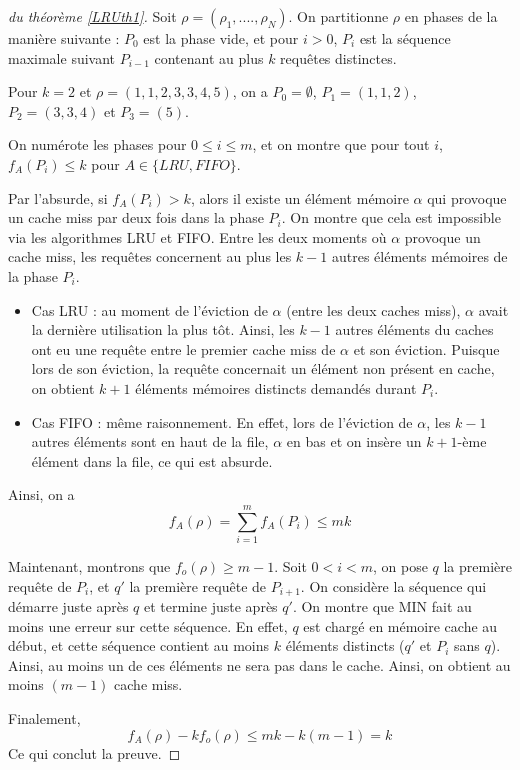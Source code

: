\begin{proof}[du théorème \ref{LRUth1}]
Soit $\rho=(\rho_1,....,\rho_N)$. On partitionne $\rho$ en phases de la manière suivante : $P_0$ est la phase vide, et pour $i>0$, $P_i$ est la séquence maximale suivant $P_{i-1}$ contenant au plus $k$ requêtes distinctes.

\begin{example} Pour $k=2$ et $\rho=(1,1,2,3,3,4,5)$, on a $P_0=\emptyset$, $P_1=(1,1,2)$, $P_2=(3,3,4)$ et $P_3=(5)$.
\end{example}

On numérote les phases pour $0\leq i \leq m$, et on montre que pour tout $i$, $f_A(P_i) \leq k$ pour $A\in \{LRU,FIFO\}$.

Par l'absurde, si $f_{A}(P_i)>k$, alors il existe un élément mémoire $\alpha$  qui provoque un cache miss par deux fois dans la phase $P_i$. On montre que cela est impossible via les algorithmes LRU et FIFO. Entre les deux moments où $\alpha$ provoque un cache miss, les requêtes concernent au plus les $k-1$ autres éléments mémoires de la phase $P_i$. 
\begin{itemize}
\item Cas LRU : au moment de l'éviction de $\alpha$ (entre les deux caches miss), $\alpha$ avait la dernière utilisation la plus tôt. Ainsi, les $k-1$ autres éléments du caches ont eu une requête entre le premier cache miss de $\alpha$ et son éviction. Puisque lors de son éviction, la requête concernait un élément non présent en cache, on obtient $k+1$ éléments mémoires distincts demandés durant $P_i$.
\item Cas FIFO : même raisonnement. En effet, lors de l'éviction de $\alpha$, les $k-1$ autres éléments sont en haut de la file, $\alpha$ en bas et on insère un $k+1$-ème élément dans la file, ce qui est absurde.
\end{itemize}

Ainsi, on a 
$$
f_A(\rho) = \sum_{i=1}^m f_A(P_i) \leq mk
$$

Maintenant, montrons que $f_o(\rho) \geq m-1$. Soit $0<i<m$, on pose $q$ la première requête de $P_i$, et $q'$ la première requête de $P_{i+1}$. On considère la séquence qui démarre juste après $q$ et termine juste après $q'$. On montre que MIN fait au moins une erreur sur cette séquence. En effet, $q$ est chargé en mémoire cache au début, et cette séquence contient au moins $k$ éléments distincts ($q'$ et $P_i$ sans $q$). Ainsi, au moins un de ces éléments ne sera pas dans le cache. Ainsi, on obtient au moins $(m-1)$ cache miss.\newline

Finalement, 
$$
f_A(\rho) -k f_o(\rho) \leq mk - k(m-1) =k
$$
Ce qui conclut la preuve.
\end{proof}

